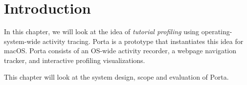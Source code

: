 \section{Introduction}
In this chapter, we will look at the idea of \emph{tutorial profiling} 
using operating-system-wide activity tracing. Porta is a prototype that 
instantiates this idea for macOS. Porta consists of an OS-wide activity 
recorder, a webpage navigation tracker, and interactive profiling 
visualizations.

This chapter will look at the system design, scope and evaluation of Porta.